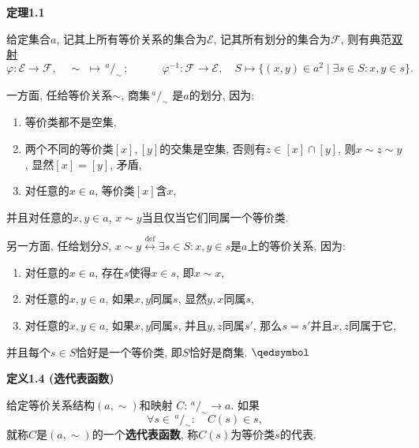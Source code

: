 \vspace{10pt}

\hypertarget{sec:定理1.1}{}
\noindent\textbf{定理1.1}

给定集合$a$, 记其上所有等价关系的集合为$\mathcal{E}$,
记其所有划分的集合为$\mathcal{F}$, 则有典范\href{03 映射#nameddest=sec:定义2.2}{双射}
\[
    \varphi:\mathcal{E}\to\mathcal{F},\quad\sim\,\,\mapsto
    \,\!^{\displaystyle a}\!/_{\displaystyle\sim}\,;\quad\quad\quad
    \varphi^{-1}:\mathcal{F}\to\mathcal{E},\quad S\mapsto
    \{(x,y)\in a^2\mid\exists s\in S:x,y\in s\}.
\]


一方面, 任给等价关系$\sim$, 商集$\,\!^{\displaystyle a}\!/_{\displaystyle\sim}$
是$a$的划分, 因为:
\begin{enumerate}
    \item 等价类都不是空集,
    \item 两个不同的等价类$[x],[y]$的交集是空集, 否则有$z\in[x]\cap[y]$,
    则$x\sim z\sim y$, 显然$[x]=[y]$, 矛盾,
    \item 对任意的$x\in a$, 等价类$[x]$含$x$,
\end{enumerate}
并且对任意的$x,y\in a$, $x\sim y$当且仅当它们同属一个等价类.

另一方面, 任给划分$S$, $x\sim y\overset{\mathrm{def}}{\leftrightarrow}
\exists s\in S:x,y\in s$是$a$上的等价关系, 因为:
\begin{enumerate}
    \item 对任意的$x\in a$, 存在$s$使得$x\in s$, 即$x\sim x$,
    \item 对任意的$x,y\in a$, 如果$x,y$同属$s$, 显然$y,x$同属$s$,
    \item 对任意的$x,y\in a$, 如果$x,y$同属$s$, 并且$y,z$同属$s'$,
    那么$s=s'$并且$x,z$同属于它,
\end{enumerate}
并且每个$s\in S$恰好是一个等价类, 即$S$恰好是商集. \hfill $\qedsymbol$





\newpage

\hypertarget{sec:定义1.4}{}
\noindent\textbf{定义1.4 (选代表函数)}

给定等价关系结构$(a,\sim)$和映射
$C:\,\!^{\displaystyle a}\!/_{\displaystyle\sim}\to a$. 如果
\[
    \forall s\in\,\!^{\displaystyle a}\!/_{\displaystyle\sim}:\quad C(s)\in s,
\]
就称$C$是$(a,\sim)$的一个\textbf{选代表函数}, 称$C(s)$为等价类$s$的代表.

\vspace{10pt}

